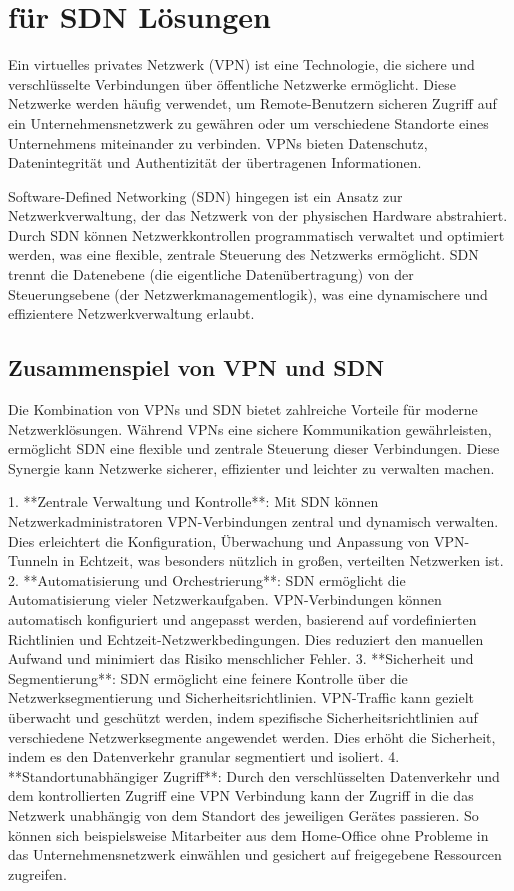 \section{ für \acrfull{SDN} Lösungen} \label{tailscale}

Ein virtuelles privates Netzwerk (VPN) ist eine Technologie, die sichere und verschlüsselte Verbindungen über öffentliche Netzwerke ermöglicht. Diese Netzwerke werden häufig verwendet, um Remote-Benutzern sicheren Zugriff auf ein Unternehmensnetzwerk zu gewähren oder um verschiedene Standorte eines Unternehmens miteinander zu verbinden. VPNs bieten Datenschutz, Datenintegrität und Authentizität der übertragenen Informationen.

Software-Defined Networking (SDN) hingegen ist ein Ansatz zur Netzwerkverwaltung, der das Netzwerk von der physischen Hardware abstrahiert. Durch SDN können Netzwerkkontrollen programmatisch verwaltet und optimiert werden, was eine flexible, zentrale Steuerung des Netzwerks ermöglicht. SDN trennt die Datenebene (die eigentliche Datenübertragung) von der Steuerungsebene (der Netzwerkmanagementlogik), was eine dynamischere und effizientere Netzwerkverwaltung erlaubt.

\subsection{Zusammenspiel von VPN und SDN}

Die Kombination von VPNs und SDN bietet zahlreiche Vorteile für moderne Netzwerklösungen. Während VPNs eine sichere Kommunikation gewährleisten, ermöglicht SDN eine flexible und zentrale Steuerung dieser Verbindungen. Diese Synergie kann Netzwerke sicherer, effizienter und leichter zu verwalten machen.

1. **Zentrale Verwaltung und Kontrolle**: Mit SDN können Netzwerkadministratoren VPN-Verbindungen zentral und dynamisch verwalten. Dies erleichtert die Konfiguration, Überwachung und Anpassung von VPN-Tunneln in Echtzeit, was besonders nützlich in großen, verteilten Netzwerken ist.
2. **Automatisierung und Orchestrierung**: SDN ermöglicht die Automatisierung vieler Netzwerkaufgaben. VPN-Verbindungen können automatisch konfiguriert und angepasst werden, basierend auf vordefinierten Richtlinien und Echtzeit-Netzwerkbedingungen. Dies reduziert den manuellen Aufwand und minimiert das Risiko menschlicher Fehler.
3. **Sicherheit und Segmentierung**: SDN ermöglicht eine feinere Kontrolle über die Netzwerksegmentierung und Sicherheitsrichtlinien. VPN-Traffic kann gezielt überwacht und geschützt werden, indem spezifische Sicherheitsrichtlinien auf verschiedene Netzwerksegmente angewendet werden. Dies erhöht die Sicherheit, indem es den Datenverkehr granular segmentiert und isoliert.
4. **Standortunabhängiger Zugriff**: Durch den verschlüsselten Datenverkehr und dem kontrollierten Zugriff eine VPN Verbindung kann der Zugriff in die das Netzwerk unabhängig von dem Standort des jeweiligen Gerätes passieren. So können sich beispielsweise Mitarbeiter aus dem Home-Office ohne Probleme in das Unternehmensnetzwerk einwählen und gesichert auf freigegebene Ressourcen zugreifen.

